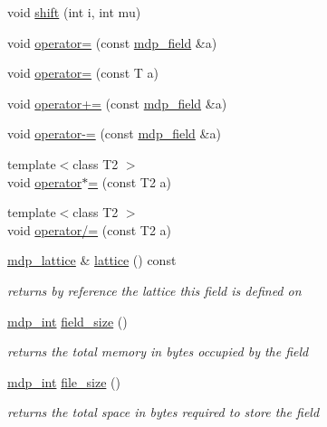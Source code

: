 \begin{DoxyCompactItemize}
\item 
void \hyperlink{classmdp__field_a8ff0ae3336b70be5c58299322662275e}{shift} (int i, int mu)
\item 
void \hyperlink{classmdp__field_a3fd348984e7f37a5d85e18bb12212017}{operator=} (const \hyperlink{classmdp__field}{mdp\_\-field} \&a)
\item 
void \hyperlink{classmdp__field_a24364bce6444668661a0688632af87ec}{operator=} (const T a)
\item 
void \hyperlink{classmdp__field_a274d9e292a6adc1703a5ad585c99036e}{operator+=} (const \hyperlink{classmdp__field}{mdp\_\-field} \&a)
\item 
void \hyperlink{classmdp__field_a84b91b09eff5b553ea69bbcb0da9fbd4}{operator-\/=} (const \hyperlink{classmdp__field}{mdp\_\-field} \&a)
\item 
{\footnotesize template$<$class T2 $>$ }\\void \hyperlink{classmdp__field_a47e967ad0fd9e0ac3e4f106e2b9c9897}{operator$\ast$=} (const T2 a)
\item 
{\footnotesize template$<$class T2 $>$ }\\void \hyperlink{classmdp__field_a3d66759cffa9ddbb3d158551247e738f}{operator/=} (const T2 a)
\item 
\hyperlink{classmdp__lattice}{mdp\_\-lattice} \& \hyperlink{classmdp__field_a31b1149be220cdeeb72281163579f3bc}{lattice} () const 
\begin{DoxyCompactList}\small\item\em returns by reference the lattice this field is defined on \item\end{DoxyCompactList}\item 
\hyperlink{mdp__global__vars_8h_aaa1ad9d0dcd2124aa5af0120d9954174}{mdp\_\-int} \hyperlink{classmdp__field_a6eff9dbb7dd88313ae2294c0178c4c74}{field\_\-size} ()
\begin{DoxyCompactList}\small\item\em returns the total memory in bytes occupied by the field \item\end{DoxyCompactList}\item 
\hyperlink{mdp__global__vars_8h_aaa1ad9d0dcd2124aa5af0120d9954174}{mdp\_\-int} \hyperlink{classmdp__field_ac6e5d57963f865e92cc59c3e9943fb3d}{file\_\-size} ()
\begin{DoxyCompactList}\small\item\em returns the total space in bytes required to store the field \item\end{DoxyCompactList}\item 

\end{DoxyCompactItemize}
